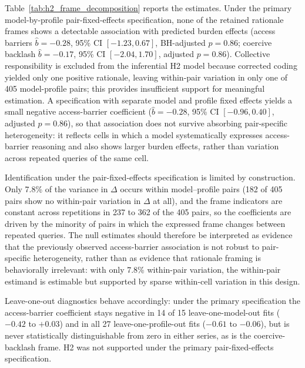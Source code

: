 \documentclass[12pt,a4paper]{article}
\begin{document}
Table~\ref{tab:h2_frame_decomposition} reports the estimates. Under the primary model-by-profile pair-fixed-effects specification, none of the retained rationale frames shows a detectable association with predicted burden effects (access barriers \(\hat{b}=-0.28\), 95\% CI \([-1.23, 0.67]\), BH-adjusted \(p=0.86\); coercive backlash \(\hat{b}=-0.17\), 95\% CI \([-2.04, 1.70]\), adjusted \(p=0.86\)). Collective responsibility is excluded from the inferential H2 model because corrected coding yielded only one positive rationale, leaving within-pair variation in only one of 405 model-profile pairs; this provides insufficient support for meaningful estimation. A specification with separate model and profile fixed effects yields a small negative access-barrier coefficient (\(\hat{b}=-0.28\), 95\% CI \([-0.96, 0.40]\), adjusted \(p=0.86\)), so that association does not survive absorbing pair-specific heterogeneity: it reflects cells in which a model systematically expresses access-barrier reasoning and also shows larger burden effects, rather than variation across repeated queries of the same cell.

Identification under the pair-fixed-effects specification is limited by construction. Only 7.8\% of the variance in \(\Delta\) occurs within model--profile pairs (182 of 405 pairs show no within-pair variation in \(\Delta\) at all), and the frame indicators are constant across repetitions in 237 to 362 of the 405 pairs, so the coefficients are driven by the minority of pairs in which the expressed frame changes between repeated queries. The null estimates should therefore be interpreted as evidence that the previously observed access-barrier association is not robust to pair-specific heterogeneity, rather than as evidence that rationale framing is behaviorally irrelevant: with only 7.8\% within-pair variation, the within-pair estimand is estimable but supported by sparse within-cell variation in this design.

Leave-one-out diagnostics behave accordingly: under the primary specification the access-barrier coefficient stays negative in 14 of 15 leave-one-model-out fits (\(-0.42\) to \(+0.03\)) and in all 27 leave-one-profile-out fits (\(-0.61\) to \(-0.06\)), but is never statistically distinguishable from zero in either series, as is the coercive-backlash frame. H2 was not supported under the primary pair-fixed-effects specification.
\end{document}
